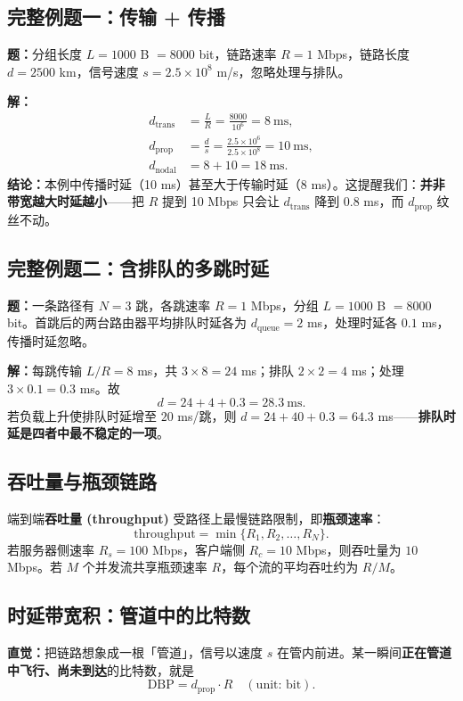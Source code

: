 \subsection{完整例题一：传输 + 传播}
\textbf{题：}分组长度 $L = 1000$ B $= 8000$ bit，链路速率 $R = 1$ Mbps，链路长度 $d = 2500$ km，信号速度 $s = 2.5\times10^{8}$ m/s，忽略处理与排队。

\textbf{解：}
\begin{align}
    d_{\text{trans}} &= \frac{L}{R} = \frac{8000}{10^{6}} = 8\ \text{ms},\\
    d_{\text{prop}}  &= \frac{d}{s} = \frac{2.5\times10^{6}}{2.5\times10^{8}} = 10\ \text{ms},\\
    d_{\text{nodal}} &= 8 + 10 = 18\ \text{ms}.
\end{align}
\textbf{结论：}本例中传播时延（10 ms）甚至大于传输时延（8 ms）。这提醒我们：\textbf{并非带宽越大时延越小}——把 $R$ 提到 10 Mbps 只会让 $d_{\text{trans}}$ 降到 0.8 ms，而 $d_{\text{prop}}$ 纹丝不动。

\subsection{完整例题二：含排队的多跳时延}
\textbf{题：}一条路径有 $N=3$ 跳，各跳速率 $R=1$ Mbps，分组 $L=1000$ B $=8000$ bit。首跳后的两台路由器平均排队时延各为 $d_{\text{queue}}=2$ ms，处理时延各 $0.1$ ms，传播时延忽略。

\textbf{解：}每跳传输 $L/R = 8$ ms，共 $3\times 8 = 24$ ms；排队 $2\times 2 = 4$ ms；处理 $3\times0.1 = 0.3$ ms。故
\[
d = 24 + 4 + 0.3 = 28.3\ \text{ms}.
\]
若负载上升使排队时延增至 $20$ ms/跳，则 $d = 24 + 40 + 0.3 = 64.3$ ms——\textbf{排队时延是四者中最不稳定的一项}。

\subsection{吞吐量与瓶颈链路}
端到端\textbf{吞吐量 (throughput)} 受路径上最慢链路限制，即\textbf{瓶颈速率}：
\begin{equation}
    \text{throughput} = \min\{R_1, R_2, \dots, R_N\}.
\end{equation}
若服务器侧速率 $R_s=100$ Mbps，客户端侧 $R_c=10$ Mbps，则吞吐量为 $10$ Mbps。若 $M$ 个并发流共享瓶颈速率 $R$，每个流的平均吞吐约为 $R/M$。

\subsection{时延带宽积：管道中的比特数}
\textbf{直觉：}把链路想象成一根「管道」，信号以速度 $s$ 在管内前进。某一瞬间\textbf{正在管道中飞行、尚未到达}的比特数，就是
\begin{equation}
    \text{DBP} = d_{\text{prop}} \cdot R \quad(\text{unit: bit}).
\end{equation}

